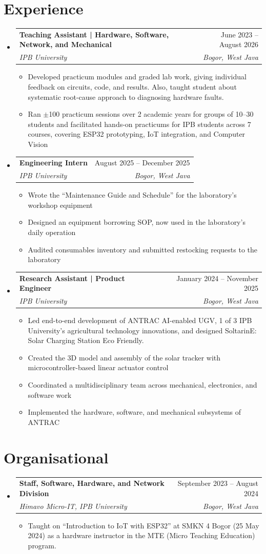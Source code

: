 \documentclass[letterpaper,11pt]{article}
\makeatletter
\newcommand{\resumeItem}[1]{
  \item\small{
    {#1 \vspace{-2pt}}
  }
}
\newcommand{\resumeSubheading}[4]{
  \vspace{-2pt}\item
    \begin{tabular*}{0.97\textwidth}[t]{l@{\extracolsep{\fill}}r}
      \textbf{#1} & #2 \\
      \textit{\small#3} & \textit{\small #4} \\
    \end{tabular*}\vspace{-7pt}
}
\newcommand{\resumeIntro}[1]{\item[]\small{#1 \vspace{-2pt}}}
\newcommand{\resumeSubHeadingListStart}{\begin{itemize}[leftmargin=0.15in, label={}]}
\newcommand{\resumeSubHeadingListEnd}{\end{itemize}}
\newcommand{\resumeItemListStart}{\begin{itemize}}
\newcommand{\resumeItemListEnd}{\end{itemize}\vspace{-5pt}}
\makeatother
\begin{document}
\section{Experience}
  \resumeSubHeadingListStart

    \resumeSubheading
      {Teaching Assistant | Hardware, Software, Network, and Mechanical}{June 2023 -- August 2026}
      {IPB University}{Bogor, West Java}
      \resumeItemListStart
        \resumeItem{Developed practicum modules and graded lab work, giving individual feedback on circuits, code, and results. Also, taught student about systematic root-cause approach to diagnosing hardware faults.}
        \resumeItem{Ran $\pm$100 practicum sessions over 2 academic years for groups of 10--30 students and facilitated hands-on practicums for IPB students across 7 courses, covering ESP32 prototyping, IoT integration, and Computer Vision }
      \resumeItemListEnd

    \resumeSubheading
      {Engineering Intern}{August 2025 -- December 2025}
      {IPB University}{Bogor, West Java}
      \resumeItemListStart
        \resumeItem{Wrote the ``Maintenance Guide and Schedule'' for the laboratory's workshop equipment}
        \resumeItem{Designed an equipment borrowing SOP, now used in the laboratory's daily operation}
        \resumeItem{Audited consumables inventory and submitted restocking requests to the laboratory}
      \resumeItemListEnd

       \resumeSubheading
      {Research Assistant | Product Engineer}{January 2024 -- November 2025}
      {IPB University}{Bogor, West Java}
      \resumeItemListStart
        \resumeIntro{Led end-to-end development of ANTRAC AI-enabled UGV, 1 of 3 IPB University's agricultural technology innovations, and designed SoltarinE: Solar Charging Station Eco Friendly.}
        \resumeItem{Created the 3D model and assembly of the solar tracker with microcontroller-based linear actuator control}
        \resumeItem{Coordinated a multidisciplinary team across mechanical, electronics, and software work}
        \resumeItem{Implemented the hardware, software, and mechanical subsystems of ANTRAC}
      \resumeItemListEnd
  \resumeSubHeadingListEnd

\section{Organisational}
  \resumeSubHeadingListStart
    \resumeSubheading
      {Staff, Software, Hardware, and Network Division}{September 2023 -- August 2024}
      {Himavo Micro-IT, IPB University}{Bogor, West Java}
      \resumeItemListStart
        \resumeItem{Taught on ``Introduction to IoT with ESP32'' at SMKN 4 Bogor (25 May 2024) as a hardware instructor in the MTE (Micro Teaching Education) program. }
      \resumeItemListEnd
  \resumeSubHeadingListEnd
\end{document}
